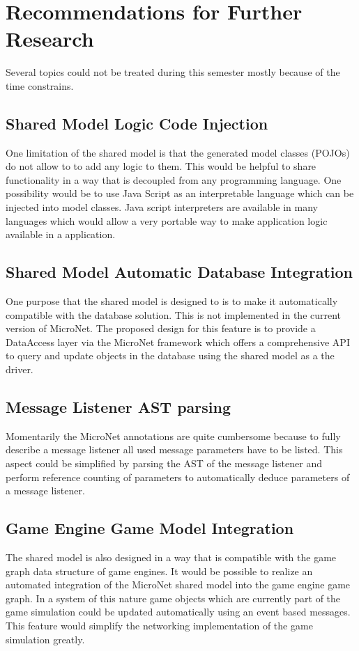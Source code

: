 \section{Recommendations for Further Research}

Several topics could not be treated during this semester mostly because of the
time constrains.

\subsection{Shared Model Logic Code Injection}
\label{sub:model_code_injection}

One limitation of the shared model is that the generated model classes (POJOs)
do not allow to to add any logic to them. This would be helpful to share
functionality in a way that is decoupled from any programming language. One
possibility would be to use Java Script as an interpretable language which can
be injected into model classes. Java script interpreters are available in many
languages which would allow a very portable way to make application logic
available in a \ms{} application.

\subsection{Shared Model Automatic Database Integration}

One purpose that the shared model is designed to is to make it automatically
compatible with the database solution. This is not implemented in the current
version of MicroNet. The proposed design for this feature is to provide a
DataAccess layer via the MicroNet framework which offers a comprehensive API to
query and update objects in the database using the shared model as a the driver.

\subsection{Message Listener AST parsing}

Momentarily the MicroNet annotations are quite cumbersome because to fully
describe a message listener all used message parameters have to be listed. This
aspect could be simplified by parsing the AST of the message listener and
perform reference counting of parameters to automatically deduce parameters of a
message listener. 

\subsection{Game Engine Game Model Integration}

The shared model is also designed in a way that is compatible with the game
graph data structure of game engines. It would be possible to realize an
automated integration of the MicroNet shared model into the game engine game
graph. In a system of this nature game objects which are currently part of the
game simulation could be updated automatically using an event based messages.
This feature would simplify the networking implementation of the game simulation
greatly.
